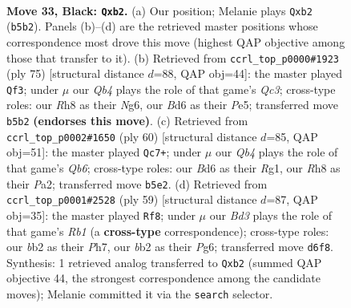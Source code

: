 \documentclass[11pt]{article}
\begin{document}
\clearpage

\begin{figure}[p]\centering
\begin{subfigure}{0.46\textwidth}\centering
\resizebox{\linewidth}{!}{%
\newchessgame
\chessboard[
  setfen={r3k2r/p5pp/3b4/nq1p1Q2/p2P2PP/4P2K/1B1N4/2R5 b - - 2 33},
  showmover=false,
  pgfstyle=straightmove, color=movearrow, markmove={b5-b2}
]}
\caption{}
\end{subfigure}\hfill
\begin{subfigure}{0.46\textwidth}\centering
\resizebox{\linewidth}{!}{%
\newchessgame
\chessboard[
  setfen={2r4k/6p1/2q3np/p1p1pN2/P1Q5/6PP/5P2/3R2K1 b - - 6 38},
  showmover=false,
  pgfstyle=straightmove, color=movearrow, markmove={c6-f3}
]}
\caption{}
\end{subfigure}
\\[4pt]
\begin{subfigure}{0.46\textwidth}\centering
\resizebox{\linewidth}{!}{%
\newchessgame
\chessboard[
  setfen={7r/5p1p/1Q5b/1N2k3/2P1p3/5q2/PP1r1P1P/R4KR1 w - - 9 31},
  showmover=false,
  pgfstyle=straightmove, color=movearrow, markmove={b6-c7}
]}
\caption{}
\end{subfigure}\hfill
\begin{subfigure}{0.46\textwidth}\centering
\resizebox{\linewidth}{!}{%
\newchessgame
\chessboard[
  setfen={1r4k1/2pr3p/4R1pQ/p7/1qp5/6BP/Pb3PPK/4R3 b - - 0 30},
  showmover=false,
  pgfstyle=straightmove, color=movearrow, markmove={b8-f8}
]}
\caption{}
\end{subfigure}
\caption{\textbf{Move 33, Black: \texttt{Qxb2}.} (a) Our position; Melanie plays \texttt{Qxb2} (\texttt{b5b2}). Panels (b)--(d) are the retrieved master positions whose correspondence most drove this move (highest QAP objective among those that transfer to it). (b) Retrieved from \texttt{ccrl\_top\_p0000\#1923} (ply 75) [structural distance $d$=88, QAP obj=44]: the master played \texttt{Qf3}; under $\mu$ our \emph{Qb4} plays the role of that game's \emph{Qc3}; cross-type roles: our \emph{R}h8 as their \emph{N}g6, our \emph{B}d6 as their \emph{P}e5; transferred move \texttt{b5b2} \textbf{(endorses this move)}. (c) Retrieved from \texttt{ccrl\_top\_p0002\#1650} (ply 60) [structural distance $d$=85, QAP obj=51]: the master played \texttt{Qc7+}; under $\mu$ our \emph{Qb4} plays the role of that game's \emph{Qb6}; cross-type roles: our \emph{B}d6 as their \emph{R}g1, our \emph{R}h8 as their \emph{P}a2; transferred move \texttt{b5e2}. (d) Retrieved from \texttt{ccrl\_top\_p0001\#2528} (ply 59) [structural distance $d$=87, QAP obj=35]: the master played \texttt{Rf8}; under $\mu$ our \emph{Bd3} plays the role of that game's \emph{Rb1} (a \textbf{cross-type} correspondence); cross-type roles: our \emph{b}b2 as their \emph{P}h7, our \emph{b}b2 as their \emph{P}g6; transferred move \texttt{d6f8}. Synthesis: 1 retrieved analog transferred to \texttt{Qxb2} (summed QAP objective 44, the strongest correspondence among the candidate moves); Melanie committed it via the \texttt{search} selector.}
\label{fig:thought-m65}
\end{figure}
\end{document}
